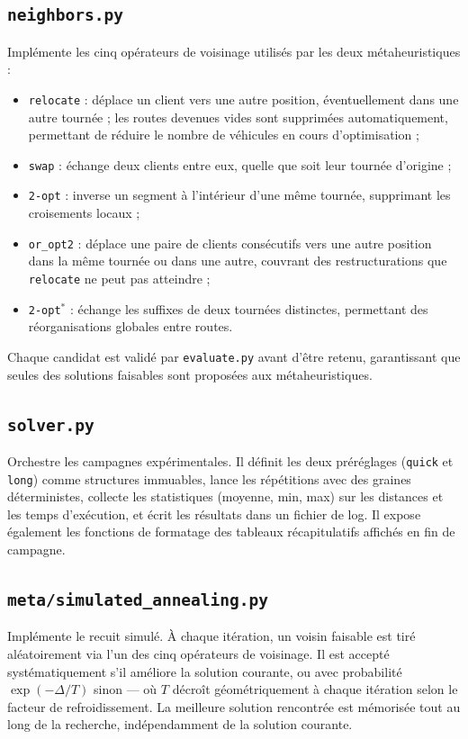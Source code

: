 \documentclass[11pt,a4paper]{article}
\begin{document}
\subsection{\texttt{neighbors.py}}
Implémente les cinq opérateurs de voisinage utilisés par les deux métaheuristiques :
\begin{itemize}
    \item \texttt{relocate} : déplace un client vers une autre position, éventuellement dans une autre tournée ; les routes devenues vides sont supprimées automatiquement, permettant de réduire le nombre de véhicules en cours d'optimisation ;
    \item \texttt{swap} : échange deux clients entre eux, quelle que soit leur tournée d'origine ;
    \item \texttt{2-opt} : inverse un segment à l'intérieur d'une même tournée, supprimant les croisements locaux ;
    \item \texttt{or\_opt2} : déplace une paire de clients consécutifs vers une autre position dans la même tournée ou dans une autre, couvrant des restructurations que \texttt{relocate} ne peut pas atteindre ;
    \item \texttt{2-opt$^*$} : échange les suffixes de deux tournées distinctes, permettant des réorganisations globales entre routes.
\end{itemize}
Chaque candidat est validé par \texttt{evaluate.py} avant d'être retenu, garantissant que seules des solutions faisables sont proposées aux métaheuristiques.

\subsection{\texttt{solver.py}}
Orchestre les campagnes expérimentales. Il définit les deux préréglages (\texttt{quick} et \texttt{long}) comme structures immuables, lance les répétitions avec des graines déterministes, collecte les statistiques (moyenne, min, max) sur les distances et les temps d'exécution, et écrit les résultats dans un fichier de log. Il expose également les fonctions de formatage des tableaux récapitulatifs affichés en fin de campagne.

\subsection{\texttt{meta/simulated\_annealing.py}}
Implémente le recuit simulé. À chaque itération, un voisin faisable est tiré aléatoirement via l'un des cinq opérateurs de voisinage. Il est accepté systématiquement s'il améliore la solution courante, ou avec probabilité $\exp(-\Delta/T)$ sinon — où $T$ décroît géométriquement à chaque itération selon le facteur de refroidissement. La meilleure solution rencontrée est mémorisée tout au long de la recherche, indépendamment de la solution courante.
\end{document}
